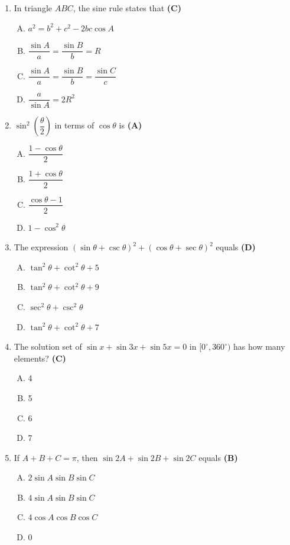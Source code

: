 \documentclass[10pt,a4paper]{article}
\begin{document}
\begin{enumerate}[1.]
\item In triangle $ABC$, the sine rule states that \hfill \textbf{(C)}
\begin{enumerate}[(A)]
    \item $a^2 = b^2 + c^2 - 2bc\cos A$
    \item $\dfrac{\sin A}{a} = \dfrac{\sin B}{b} = R$
    \item $\dfrac{\sin A}{a} = \dfrac{\sin B}{b} = \dfrac{\sin C}{c}$
    \item $\dfrac{a}{\sin A} = 2R^2$
\end{enumerate}

\item $\sin^2\!\left(\dfrac{\theta}{2}\right)$ in terms of $\cos\theta$ is \hfill \textbf{(A)}
\begin{enumerate}[(A)]
    \item $\dfrac{1-\cos\theta}{2}$
    \item $\dfrac{1+\cos\theta}{2}$
    \item $\dfrac{\cos\theta - 1}{2}$
    \item $1 - \cos^2\theta$
\end{enumerate}

\item The expression $(\sin\theta + \csc\theta)^2 + (\cos\theta + \sec\theta)^2$ equals \hfill \textbf{(D)}
\begin{enumerate}[(A)]
    \item $\tan^2\theta + \cot^2\theta + 5$
    \item $\tan^2\theta + \cot^2\theta + 9$
    \item $\sec^2\theta + \csc^2\theta$
    \item $\tan^2\theta + \cot^2\theta + 7$
\end{enumerate}

\item The solution set of $\sin x + \sin 3x + \sin 5x = 0$ in $[0^\circ, 360^\circ)$ has how many elements? \hfill \textbf{(C)}
\begin{enumerate}[(A)]
    \item 4
    \item 5
    \item 6
    \item 7
\end{enumerate}

\item If $A + B + C = \pi$, then $\sin 2A + \sin 2B + \sin 2C$ equals \hfill \textbf{(B)}
\begin{enumerate}[(A)]
    \item $2\sin A\sin B\sin C$
    \item $4\sin A\sin B\sin C$
    \item $4\cos A\cos B\cos C$
    \item $0$
\end{enumerate}


\end{enumerate}
\end{document}
